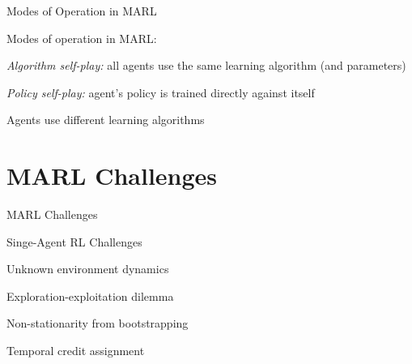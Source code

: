 \begin{frame}{Modes of Operation in MARL}

Modes of operation in MARL:

\vspace{5pt}

\blist
    \item {\it Algorithm self-play:} all agents use the same learning algorithm (and parameters)
    \item {\it Policy self-play:} agent's policy is trained directly against itself
\elist

\vspace{5pt}

\blist
    \item Agents use different learning algorithms
\elist
    
\end{frame}

\section{MARL Challenges}

\begin{frame}{MARL Challenges}

\small 

\bcol
		\begin{redtitlebox}{Singe-Agent RL Challenges}
		\blist
		    \item Unknown environment dynamics
		    \item Exploration-exploitation dilemma
		    \item Non-stationarity from bootstrapping
		    \item Temporal credit assignment
		\elist
		\end{redtitlebox}
		
\ecol    
\end{frame}

